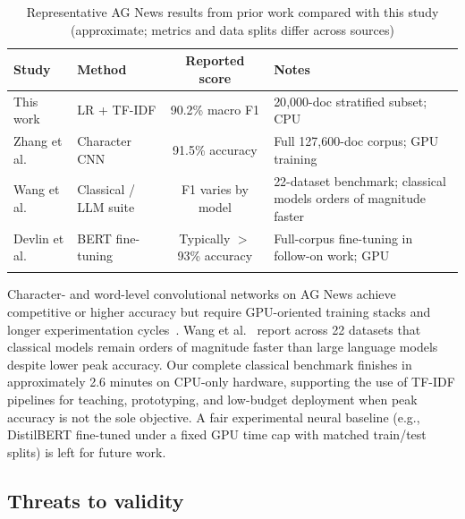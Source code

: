 \documentclass[pdflatex,sn-mathphys-num]{sn-jnl}
\begin{document}
\begin{table}[t]
\caption{Representative AG News results from prior work compared with this study (approximate; metrics and data splits differ across sources)}\label{tab:literature}
\begin{tabular}{@{}p{2.8cm}p{3.2cm}cp{3.5cm}@{}}
\toprule
Study & Method & Reported score & Notes \\
\midrule
This work & LR + TF-IDF & 90.2\% macro F1 & 20{,}000-doc stratified subset; CPU \\
Zhang et al.~\cite{zhang2015character} & Character CNN & 91.5\% accuracy & Full 127{,}600-doc corpus; GPU training \\
Wang et al.~\cite{wang2024atcbench} & Classical / LLM suite & F1 varies by model & 22-dataset benchmark; classical models orders of magnitude faster \\
Devlin et al.~\cite{devlin2019bert} & BERT fine-tuning & Typically $>$93\% accuracy & Full-corpus fine-tuning in follow-on work; GPU \\
\botrule
\end{tabular}
\end{table}

Character- and word-level convolutional networks on AG News achieve competitive or higher accuracy but require GPU-oriented training stacks and longer experimentation cycles~\cite{zhang2015character,devlin2019bert}. Wang et al.~\cite{wang2024atcbench} report across 22 datasets that classical models remain orders of magnitude faster than large language models despite lower peak accuracy. Our complete classical benchmark finishes in approximately 2.6 minutes on CPU-only hardware, supporting the use of TF-IDF pipelines for teaching, prototyping, and low-budget deployment when peak accuracy is not the sole objective. A fair experimental neural baseline (e.g., DistilBERT fine-tuned under a fixed GPU time cap with matched train/test splits) is left for future work.

\subsection{Threats to validity}\label{sec:limitations}
\end{document}
